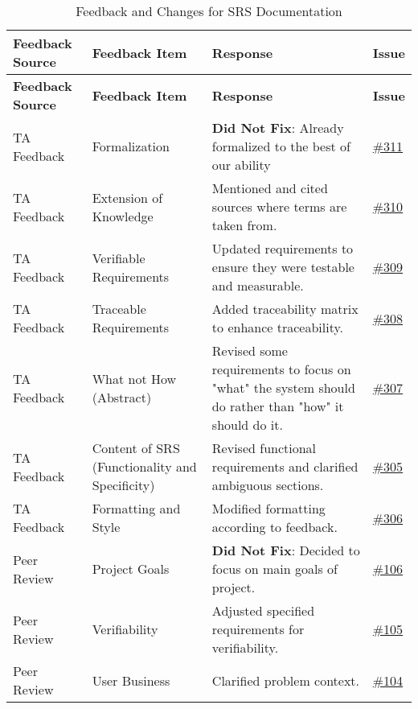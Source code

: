 \documentclass{article}
\begin{document}
\begin{longtable}{| p{} | p{} | p{} | p{} |}
    \caption{Feedback and Changes for SRS Documentation} \\
    \hline
    \textbf{Feedback Source} & \textbf{Feedback Item} & \textbf{Response} & \textbf{Issue} \\
    \hline
    \endfirsthead
    \hline
    \textbf{Feedback Source} & \textbf{Feedback Item} & \textbf{Response} & \textbf{Issue} \\
    \hline
    \endhead
    \hline
    \endfoot
    TA Feedback & Formalization & \textbf{Did Not Fix}: Already formalized to the best of our ability & \href{https://github.com/TPGEngine/tpg/issues/311}{\#311}\\
    \hline
    TA Feedback & Extension of Knowledge & Mentioned and cited sources where terms are taken from. & \href{https://github.com/TPGEngine/tpg/issues/310}{\#310} \\
    \hline
    TA Feedback & Verifiable Requirements & Updated requirements to ensure they were testable and measurable. & \href{https://github.com/TPGEngine/tpg/issues/309}{\#309}\\
    \hline
    TA Feedback & Traceable Requirements & Added traceability matrix to enhance traceability. & \href{https://github.com/TPGEngine/tpg/issues/308}{\#308} \\
    \hline
    TA Feedback & What not How (Abstract) & Revised some requirements to focus on "what" the system should do rather than "how" it should do it. & \href{https://github.com/TPGEngine/tpg/issues/307}{\#307} \\
    \hline
    TA Feedback & Content of SRS (Functionality and Specificity) & Revised functional requirements and clarified ambiguous sections. & \href{https://github.com/TPGEngine/tpg/issues/305}{\#305} \\
    \hline
    TA Feedback & Formatting and Style & Modified formatting according to feedback. & \href{https://github.com/TPGEngine/tpg/issues/306}{\#306} \\
    \hline
    Peer Review & Project Goals & \textbf{Did Not Fix}: Decided to focus on main goals of project. & \href{https://github.com/TPGEngine/tpg/issues/106}{\#106} \\
    \hline
    Peer Review & Verifiability & Adjusted specified requirements for verifiability.  & \href{https://github.com/TPGEngine/tpg/issues/105}{\#105} \\
    \hline
    Peer Review & User Business & Clarified problem context. & \href{https://github.com/TPGEngine/tpg/issues/104}{\#104} \\

\end{longtable}
\end{document}
